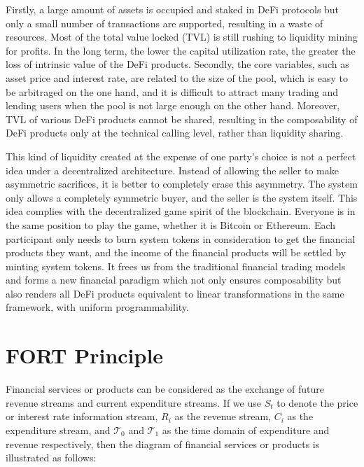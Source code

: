 \documentclass[letterpaper,12pt]{article}
\begin{document}
Firstly, a large amount of assets is occupied and staked in DeFi protocols but only a small number of transactions are supported, resulting in a waste of resources. Most of the total value locked (TVL) is still rushing to liquidity mining for profits. 
In the long term, the lower the capital utilization rate, the greater the loss of intrinsic value of the DeFi products.
Secondly, the core variables, such as asset price and interest rate, are related to the size of the pool, which is easy to be arbitraged on the one hand, and it is difficult to attract many trading and lending users when the pool is not large enough on the other hand. 
Moreover, TVL of various DeFi products cannot be shared, resulting in the composability of DeFi products only at the technical calling level, rather than liquidity sharing.

This kind of liquidity created at the expense of one party's choice is not a perfect idea under a decentralized architecture. 
Instead of allowing the seller to make asymmetric sacrifices, it is better to completely erase this asymmetry. 
The system only allows a completely symmetric buyer, and the seller is the system itself. 
This idea complies with the decentralized game spirit of the blockchain. 
Everyone is in the same position to play the game, whether it is Bitcoin or Ethereum. 
Each participant only needs to burn system tokens in consideration to get the financial products they want, and the income of the financial products will be settled by minting system tokens. 
It frees us from the traditional financial trading models and forms a new financial paradigm which not only ensures composability but also renders all DeFi products equivalent to linear transformations in the same framework, with uniform programmability.

\section{FORT Principle}

Financial services or products can be considered as the exchange of future revenue streams and current expenditure streams. 
If we use $S_t$ to denote the price or interest rate information stream, $R_i$ as the revenue stream, $C_i$ as the expenditure stream, and $\mathcal{T}_0$ and $\mathcal{T}_1$ as the time domain of expenditure and revenue respectively, then the diagram of financial services or products is illustrated as follows:
\end{document}
